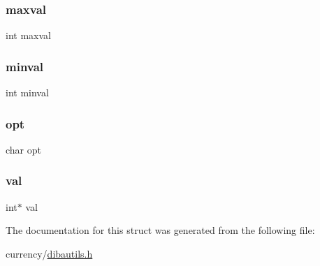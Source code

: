 \mbox{\label{struct__opts2_ab78d5bc0b5eb537373d2ae9db01011b4}} 
\subsubsection{\texorpdfstring{maxval}{maxval}}
{\footnotesize\ttfamily int maxval}

\mbox{\label{struct__opts2_a271861b7d4422e3cddf03d604408cf3a}} 
\subsubsection{\texorpdfstring{minval}{minval}}
{\footnotesize\ttfamily int minval}

\mbox{\label{struct__opts2_a6b9d817d08c1417f5c533eb8ad775312}} 
\subsubsection{\texorpdfstring{opt}{opt}}
{\footnotesize\ttfamily char opt}

\mbox{\label{struct__opts2_a482251298d068445d0ecb6f0c6ed54a7}} 
\subsubsection{\texorpdfstring{val}{val}}
{\footnotesize\ttfamily int$\ast$ val}



The documentation for this struct was generated from the following file\+:\begin{DoxyCompactItemize}
\item 
currency/\hyperlink{dibautils_8h}{dibautils.\+h}\end{DoxyCompactItemize}
